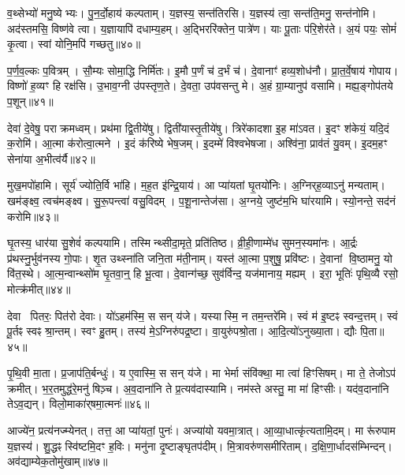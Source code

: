 व॒थ्सेभ्यो॑ मनु॒ष्येभ्यः।
पु॒न॒र्दो॒हाय॑ कल्पताम्।
य॒ज्ञस्य॒ सन्त॑तिरसि।
य॒ज्ञस्य॑ त्वा॒ सन्त॑ति॒मनु॒ सन्त॑नोमि।
अद॑स्तमसि॒ विष्ण॑वे त्वा।
य॒ज्ञायापि॑ दधाम्य॒हम्।
अ॒द्भिररि॑क्तेन॒ पात्रे॑ण।
याः पू॒ताः प॑रि॒शेर॑ते।
अ॒यं पयः॒ सोमं॑ कृ॒त्वा।
स्वां योनि॒मपि॑ गच्छतु॥४०॥

प॒र्ण॒व॒ल्कः प॒वित्रम्।
सौ॒म्यः सोमा॒द्धि निर्मि॑तः।
इ॒मौ प॒र्णं च॑ द॒र्भं च॑।
दे॒वानाꣳ॑ हव्य॒शोध॑नौ।
प्रा॒त॒र्वे॒षाय॑ गोपाय।
विष्णो॑ ह॒व्यꣳ हि रक्ष॑सि।
उ॒भाव॒ग्नी उ॑पस्तृण॒ते।
दे॒वता॒ उप॑वसन्तु मे।
अ॒हं ग्रा॒म्यानुप॑ वसामि।
मह्य॒ङ्गोप॑तये प॒शून्॥४१॥\anuvakamend[आभृ॑त इ॒मं गृ॑ह्णामि॒ पूर्व॒स्ताः पूर्वः॒ परि॑गृह्णामि सभापा॒ला इन्द्र॑ज्येष्ठेभ्य॒ आदि॑त्य व्रतपते सुस॒म्भृता॑ मे स॒ह पु॑नातु गहि नो वि॒श्वरू॑पा दधातु॒ पुन॑र्गच्छतु प॒शून् (याः पु॒रस्ता॑दि॒मामूर्ज॑मि॒ह प्र॒जा इ॒ह प॒शवो॒ऽयं पि॑तृ॒णाम॒ग्निः।
)]

देवा॑ दे॒वेषु॒ पराक्रमध्वम्।
प्रथ॑मा द्वि॒तीये॑षु।
द्विती॑यास्तृ॒तीये॑षु।
त्रिरे॑कादशा इ॒ह मा॑ऽवत।
इ॒दꣳ श॑केयं॒ यदि॒दं क॒रोमि॑।
आ॒त्मा क॑रोत्वा॒त्मने।
इ॒दं क॑रिष्ये भेष॒जम्।
इ॒दम्मे॑ विश्वभेषजा।
अश्वि॑ना॒ प्राव॑तं यु॒वम्।
इ॒दम॒हꣳ सेना॑या अ॒भीत्व॑र्यै॥४२॥

मुख॒मपो॑हामि।
सूर्य॑ ज्योति॒र्वि भा॑हि।
म॒ह॒त इ॑न्द्रि॒याय॑।
आ प्या॑यतां घृ॒तयो॑निः।
अ॒ग्निर्‌\mbox{}ह॒व्याऽनु॑ मन्यताम्।
खम॑ङ्क्ष्व॒ त्वच॑मङ्क्ष्व।
सु॒रू॒पन्त्वा॑ वसु॒विदम्।
प॒शू॒नान्तेज॑सा।
अ॒ग्नये॒ जुष्ट॑म॒भि घा॑रयामि।
स्यो॒नन्ते॒ सद॑नं करोमि॥४३॥

घृ॒तस्य॒ धार॑या सु॒शेवं॑ कल्पयामि।
तस्मिन्थ्सीदा॒मृते॒ प्रति॑तिष्ठ।
व्री॒ही॒णाम्मे॑ध सुमन॒स्यमा॑नः।
आ॒र्द्रः प्र॑थस्नु॒र्भुव॑नस्य गो॒पाः।
शृ॒त उथ्स्ना॑ति जनि॒ता म॑ती॒नाम्।
यस्त॑ आ॒त्मा प॒शुषु॒ प्रवि॑ष्टः।
दे॒वानां वि॒ष्ठामनु॒ यो वि॑त॒स्थे।
आ॒त्म॒न्वान्थ्सो॑म घृ॒तवा॒न्॒ हि भू॒त्वा।
दे॒वान्ग॑च्छ॒ सुव॑र्विन्द॒ यज॑मानाय॒ मह्यम्।
इरा॒ भूतिः॑ पृथि॒व्यै रसो॒ मोत्क्र॑मीत्॥४४॥

देवा पितरः॒ पित॑रो देवाः।
यो॑ऽहम॑स्मि॒ स सन् य॑जे।
यस्यास्मि॒ न तम॒न्तरे॑मि।
स्वं म॑ इ॒ष्टꣴ स्वन्द॒त्तम्।
स्वं पू॒र्तꣴ स्वꣴ श्रा॒न्तम्।
स्वꣳ हु॒तम्।
तस्य॑ मे॒\-ऽग्निरु॑पद्र॒ष्टा।
वा॒युरु॑पश्रो॒ता।
आ॒दि॒त्यो॑\-ऽनुख्या॒ता।
द्यौः पि॒ता॥४५॥

पृ॒थि॒वी मा॒ता।
प्र॒जाप॑ति॒र्बन्धुः॑।
य ए॒वास्मि॒ स सन् य॑जे।
मा भेर्मा संवि॑क्था॒ मा त्वा॑ हिꣳसिषम्।
मा ते॒ तेजोऽप॑ क्रमीत्।
भ॒र॒तमुद्ध॑रे॒मनु॑ षिञ़्च।
अ॒व॒दाना॑नि ते प्र॒त्यव॑दास्यामि।
नम॑स्ते अस्तु॒ मा मा॑ हिꣳसीः।
यद॑व॒दाना॑नि तेऽव॒द्यन्।
विलो॒माका॑र्‌\mbox{}षमा॒त्मनः॑॥४६॥

आज्ये॑न॒ प्रत्य॑नज्म्येनत्।
तत्त॒ आ प्या॑यतां॒ पुनः॑।
अज्या॑यो यवमा॒त्रात्।
आ॒व्या॒धात्कृ॑त्यतामि॒दम्।
मा रू॑रुपाम य॒ज्ञस्य॑।
शु॒द्धꣴ स्वि॑ष्टमि॒दꣳ ह॒विः।
मनु॑ना दृ॒ष्टाङ्घृतप॑दीम्।
मि॒त्रावरु॑णसमीरिताम्।
द॒क्षि॒णा॒र्धादस॑म्भिन्दन्।
अव॑द्याम्ये\-क॒तोमु॑खाम्॥४७॥

